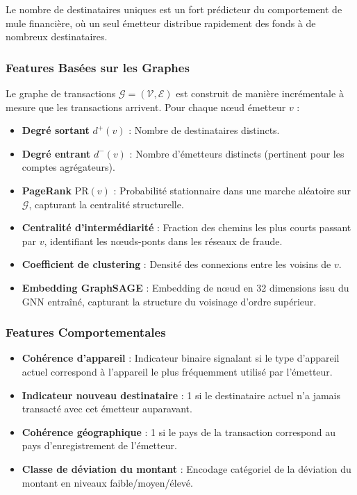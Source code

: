 \documentclass[12pt,a4paper,oneside]{book}
\theoremstyle{definition}
\theoremstyle{plain}
\begin{document}
Le nombre de destinataires uniques est un fort prédicteur du comportement de mule financière, où un seul émetteur distribue rapidement des fonds à de nombreux destinataires.

\subsubsection{Features Basées sur les Graphes}

Le graphe de transactions $\mathcal{G} = (\mathcal{V}, \mathcal{E})$ est construit de manière incrémentale à mesure que les transactions arrivent. Pour chaque nœud émetteur $v$ :

\begin{itemize}
  \item \textbf{Degré sortant} $d^+(v)$ : Nombre de destinataires distincts.
  \item \textbf{Degré entrant} $d^-(v)$ : Nombre d'émetteurs distincts (pertinent pour les comptes agrégateurs).
  \item \textbf{PageRank} $\text{PR}(v)$ : Probabilité stationnaire dans une marche aléatoire sur $\mathcal{G}$, capturant la centralité structurelle.
  \item \textbf{Centralité d'intermédiarité} : Fraction des chemins les plus courts passant par $v$, identifiant les nœuds-ponts dans les réseaux de fraude.
  \item \textbf{Coefficient de clustering} : Densité des connexions entre les voisins de $v$.
  \item \textbf{Embedding GraphSAGE} : Embedding de nœud en 32 dimensions issu du GNN entraîné, capturant la structure du voisinage d'ordre supérieur.
\end{itemize}

\subsubsection{Features Comportementales}

\begin{itemize}
  \item \textbf{Cohérence d'appareil} : Indicateur binaire signalant si le type d'appareil actuel correspond à l'appareil le plus fréquemment utilisé par l'émetteur.
  \item \textbf{Indicateur nouveau destinataire} : 1 si le destinataire actuel n'a jamais transacté avec cet émetteur auparavant.
  \item \textbf{Cohérence géographique} : 1 si le pays de la transaction correspond au pays d'enregistrement de l'émetteur.
  \item \textbf{Classe de déviation du montant} : Encodage catégoriel de la déviation du montant en niveaux faible/moyen/élevé.
\end{itemize}
\end{document}
